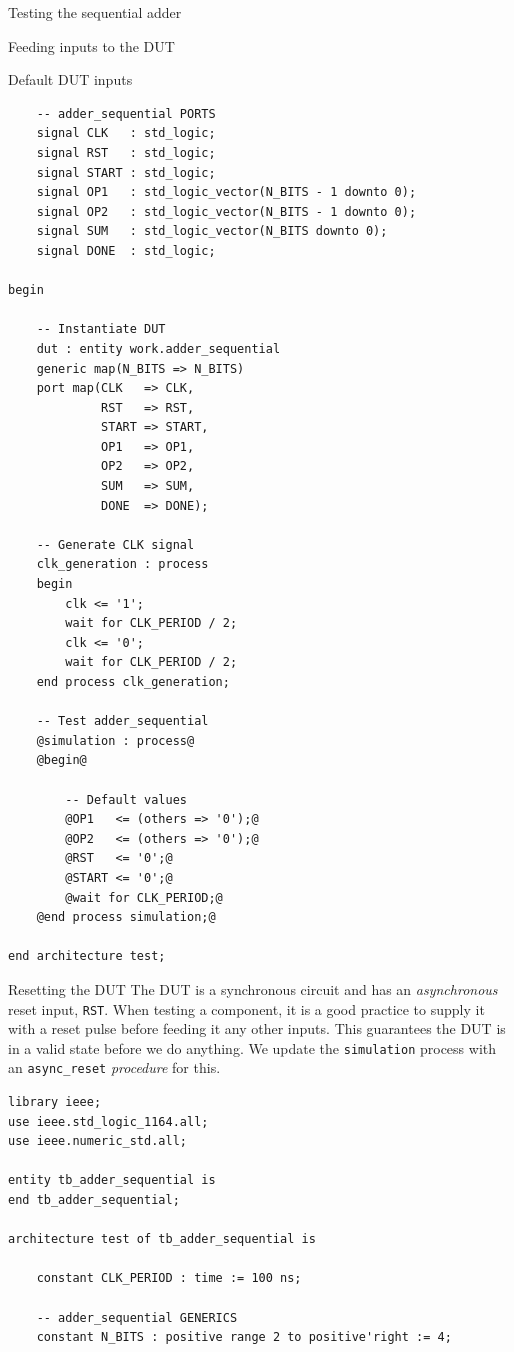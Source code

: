 \documentclass[lab]{course}
\begin{document}
\begin{section}{Testing the sequential adder}
\begin{subsection}{Feeding inputs to the DUT}
\begin{subsubsection}{Default DUT inputs}
\begin{lstlisting}
    -- adder_sequential PORTS
    signal CLK   : std_logic;
    signal RST   : std_logic;
    signal START : std_logic;
    signal OP1   : std_logic_vector(N_BITS - 1 downto 0);
    signal OP2   : std_logic_vector(N_BITS - 1 downto 0);
    signal SUM   : std_logic_vector(N_BITS downto 0);
    signal DONE  : std_logic;

begin

    -- Instantiate DUT
    dut : entity work.adder_sequential
    generic map(N_BITS => N_BITS)
    port map(CLK   => CLK,
             RST   => RST,
             START => START,
             OP1   => OP1,
             OP2   => OP2,
             SUM   => SUM,
             DONE  => DONE);

    -- Generate CLK signal
    clk_generation : process
    begin
        clk <= '1';
        wait for CLK_PERIOD / 2;
        clk <= '0';
        wait for CLK_PERIOD / 2;
    end process clk_generation;

    -- Test adder_sequential
    @simulation : process@
    @begin@

        -- Default values
        @OP1   <= (others => '0');@
        @OP2   <= (others => '0');@
        @RST   <= '0';@
        @START <= '0';@
        @wait for CLK_PERIOD;@
    @end process simulation;@

end architecture test;
            \end{lstlisting}
        \end{subsubsection}

        \begin{subsubsection}{Resetting the DUT}
            The DUT is a synchronous circuit and has an \emph{asynchronous} reset input, \verb+RST+. When testing a component, it is a good practice to supply it with a reset pulse before feeding it any other inputs. This guarantees the DUT is in a valid state before we do anything. We update the \verb+simulation+ process with an \verb+async_reset+ \emph{procedure} for this.

            \begin{lstlisting}[caption={Add \emph{asynchronous} reset}, label={lst:sequential_process_simulation_async_reset}]
library ieee;
use ieee.std_logic_1164.all;
use ieee.numeric_std.all;

entity tb_adder_sequential is
end tb_adder_sequential;

architecture test of tb_adder_sequential is

    constant CLK_PERIOD : time := 100 ns;

    -- adder_sequential GENERICS
    constant N_BITS : positive range 2 to positive'right := 4;


\end{lstlisting}
\end{subsubsection}
\end{subsection}
\end{section}
\end{document}
